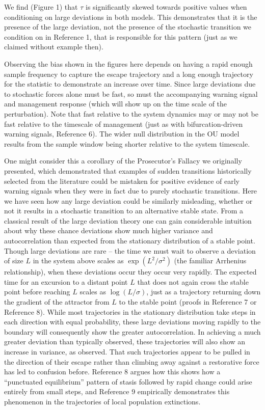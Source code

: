 \documentclass{article}
\begin{document}
We find (Figure 1) that $\tau$ is significantly skewed towards positive
values when conditioning on large deviations in both models. This
demonstrates that it is the presence of the large deviation, not the
presence of the stochastic transition we condition on in Reference 1,
that is responsible for this pattern (just as we claimed without example
then).

Observing the bias shown in the figures here depends on having a rapid
enough sample frequency to capture the escape trajectory and a long
enough trajectory for the statistic to demonstrate an increase over
time. Since large deviations due to stochastic forces alone must be
fast, so must the accompanying warning signal and management response
(which will show up on the time scale of the perturbation). Note that
fast relative to the system dynamics may or may not be fast relative to
the timescale of management (just as with bifurcation-driven warning
signals, Reference 6). The wider null distribution in the OU model
results from the sample window being shorter relative to the system
timescale.

One might consider this a corollary of the Prosecutor's Fallacy we
originally presented, which demonstrated that examples of sudden
transitions historically selected from the literature could be mistaken
for positive evidence of early warning signals when they were in fact
due to purely stochastic transitions. Here we have seen how any large
deviation could be similarly misleading, whether or not it results in a
stochastic transition to an alternative stable state. From a classical
result of the large deviation theory one can gain considerable intuition
about why these chance deviations show much higher variance and
autocorrelation than expected from the stationary distribution of a
stable point. Though large deviations are rare -- the time we must wait
to observe a deviation of size $L$ in the system above scales as
$\exp\left(L^2/\sigma^2\right)$ (the familiar Arrhenius relationship),
when these deviations occur they occur very rapidly. The expected time
for an excursion to a distant point $L$ that does not again cross the
stable point before reaching $L$ scales as $\log(L/\sigma)$, just as a
trajectory returning down the gradient of the attractor from $L$ to the
stable point (proofs in Reference 7 or Reference 8). While most
trajectories in the stationary distribution take steps in each direction
with equal probability, these large deviations moving rapidly to the
boundary will consequently show the greater autocorrelation. In
achieving a much greater deviation than typically observed, these
trajectories will also show an increase in variance, as observed. That
such trajectories appear to be pulled in the direction of their escape
rather than climbing away against a restorative force has led to
confusion before. Reference 8 argues how this shows how a ``punctuated
equilibrium'' pattern of stasis followed by rapid change could arise
entirely from small steps, and Reference 9 empirically demonstrates this
phenomenon in the trajectories of local population extinctions.
\end{document}
